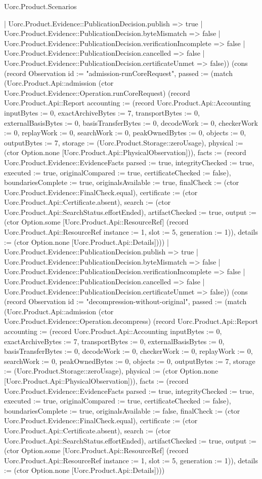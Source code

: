 \begin{lexlean}{Uorc.Product.Scenarios}
\begin{semanticmodule}
{{    | Uorc.Product.Evidence::PublicationDecision.publish => true
    | Uorc.Product.Evidence::PublicationDecision.byteMismatch => false
    | Uorc.Product.Evidence::PublicationDecision.verificationIncomplete => false
    | Uorc.Product.Evidence::PublicationDecision.cancelled => false
    | Uorc.Product.Evidence::PublicationDecision.certificateUnmet => false)}) (cons (record Observation {id := "admission-runCoreRequest", passed := (match (Uorc.Product.Api::admission (ctor Uorc.Product.Evidence::Operation.runCoreRequest) (record Uorc.Product.Api::Report {accounting := (record Uorc.Product.Api::Accounting {inputBytes := 0, exactArchiveBytes := 7, transportBytes := 0, externalBasisBytes := 0, basisTransferBytes := 0, decodeWork := 0, checkerWork := 0, replayWork := 0, searchWork := 0, peakOwnedBytes := 0, objects := 0, outputBytes := 7, storage := (Uorc.Product.Storage::zeroUsage), physical := (ctor Option.none [Uorc.Product.Api::PhysicalObservation])}), facts := (record Uorc.Product.Evidence::EvidenceFacts {parsed := true, integrityChecked := true, executed := true, originalCompared := true, certificateChecked := false}), boundariesComplete := true, originalsAvailable := true, finalCheck := (ctor Uorc.Product.Evidence::FinalCheck.equal), certificate := (ctor Uorc.Product.Api::Certificate.absent), search := (ctor Uorc.Product.Api::SearchStatus.effortEnded), artifactChecked := true, output := (ctor Option.some [Uorc.Product.Api::ResourceRef] (record Uorc.Product.Api::ResourceRef {instance := 1, slot := 5, generation := 1})), details := (ctor Option.none [Uorc.Product.Api::Details])}))
    | Uorc.Product.Evidence::PublicationDecision.publish => true
    | Uorc.Product.Evidence::PublicationDecision.byteMismatch => false
    | Uorc.Product.Evidence::PublicationDecision.verificationIncomplete => false
    | Uorc.Product.Evidence::PublicationDecision.cancelled => false
    | Uorc.Product.Evidence::PublicationDecision.certificateUnmet => false)}) (cons (record Observation {id := "decompression-without-original", passed := (match (Uorc.Product.Api::admission (ctor Uorc.Product.Evidence::Operation.decompress) (record Uorc.Product.Api::Report {accounting := (record Uorc.Product.Api::Accounting {inputBytes := 0, exactArchiveBytes := 7, transportBytes := 0, externalBasisBytes := 0, basisTransferBytes := 0, decodeWork := 0, checkerWork := 0, replayWork := 0, searchWork := 0, peakOwnedBytes := 0, objects := 0, outputBytes := 7, storage := (Uorc.Product.Storage::zeroUsage), physical := (ctor Option.none [Uorc.Product.Api::PhysicalObservation])}), facts := (record Uorc.Product.Evidence::EvidenceFacts {parsed := true, integrityChecked := true, executed := true, originalCompared := true, certificateChecked := false}), boundariesComplete := true, originalsAvailable := false, finalCheck := (ctor Uorc.Product.Evidence::FinalCheck.equal), certificate := (ctor Uorc.Product.Api::Certificate.absent), search := (ctor Uorc.Product.Api::SearchStatus.effortEnded), artifactChecked := true, output := (ctor Option.some [Uorc.Product.Api::ResourceRef] (record Uorc.Product.Api::ResourceRef {instance := 1, slot := 5, generation := 1})), details := (ctor Option.none [Uorc.Product.Api::Details])}))
}}
\end{semanticmodule}
\end{lexlean}

